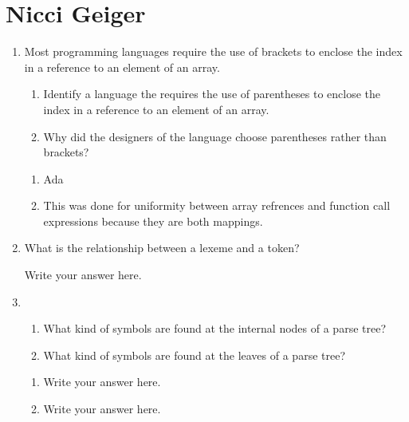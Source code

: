 
\chapter{Nicci Geiger}

\begin{enumerate}
  \item Most programming languages require the use of brackets to
    enclose the index in a reference to an element of an array.
  \begin{enumerate}
    \item Identify a language the requires the use of parentheses
      to enclose the index in a reference to an element of an array.
    \item Why did the designers of the language choose parentheses
      rather than brackets?
    \end{enumerate}

  \begin{answer}

  \begin{enumerate}
    \item Ada
    \item This was done for uniformity between array refrences and function call expressions because they are both mappings.
    \end{enumerate}

    \end{answer}
    
  \item What is the relationship between a lexeme and a token?

  \begin{answer}

    Write your answer here.

    \end{answer}

  \item
  \begin{enumerate}
    \item What kind of symbols are found at the internal nodes of a
      parse tree?
    \item What kind of symbols are found at the leaves of a parse tree?
    \end{enumerate}

  \begin{answer}

  \begin{enumerate}
    \item Write your answer here.
    \item Write your answer here.
    \end{enumerate}


\end{answer}
\end{enumerate}
